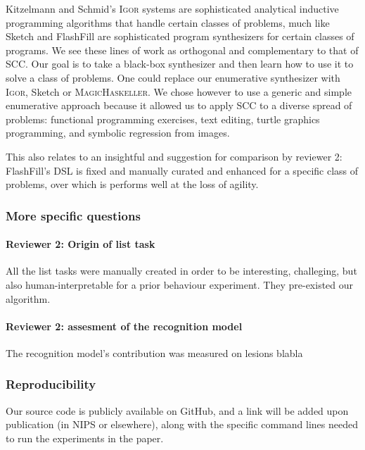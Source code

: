 \documentclass{article}
\begin{document}
Kitzelmann and Schmid's \textsc{Igor} systems are sophisticated
analytical inductive programming algorithms that handle certain classes of
problems, much like {Sketch} and {FlashFill} are sophisticated program
synthesizers for certain classes of programs.
We see these lines of work as orthogonal and complementary to that of SCC\@. Our
goal is to take a black-box synthesizer and then learn how to use it to solve a class of
problems. One could replace our enumerative synthesizer
with \textsc{Igor}, Sketch or \textsc{MagicHaskeller}. We chose however to
use a generic and simple enumerative approach because it allowed us to apply SCC
to a diverse spread of problems: functional programming exercises, text editing,
turtle graphics programming, and symbolic regression from images.

This also relates to an insightful
and suggestion for comparison by reviewer 2: FlashFill's DSL is fixed and
manually curated and enhanced for a specific class of problems, over which is
performs well at the loss of agility.


\subsubsection*{More specific questions}

\paragraph*{Reviewer 2: Origin of list task} All the list tasks were manually
created in order to be interesting, challeging, but also human-interpretable for
a prior behaviour experiment. They pre-existed our algorithm.

\paragraph*{Reviewer 2: assesment of the recognition model} The recognition
model's contribution was measured on lesions blabla


\subsubsection*{Reproducibility}
Our source code is publicly available on GitHub,
and a link will be added upon publication (in NIPS or elsewhere),
along with the specific command lines  needed to run
the experiments in the paper.

\end{document}
